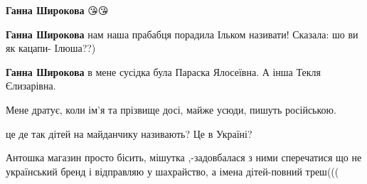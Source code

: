 \begin{itemize}
\begin{itemize}
 
\textbf{Ганна Широкова} 😘😘

 
\textbf{Ганна Широкова} нам наша прабабця порадила Ільком називати! Сказала: шо ви як кацапи- Ілюша??)

 
\textbf{Ганна Широкова} в мене сусідка була Параска Ялосеївна. А інша Текля Єлизарівна.

 
Мене дратує, коли ім'я та прізвище досі, майже усюди, пишуть російською.
\end{itemize}

 
це де так дітей на майданчику називають? Це в Україні?

 

Антошка магазин просто бісить, мішутка ,-задовбалася з ними сперечатися що не
український бренд і відправляю у шахрайство, а імена дітей-повний треш(((


\end{itemize}
